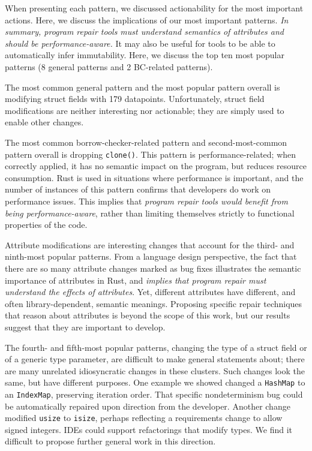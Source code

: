 When presenting each pattern, we discussed actionability for the most important actions. Here, we discuss the implications of our most important patterns. \emph{In summary, program repair tools must understand semantics of attributes and should be performance-aware.} It may also be useful for tools to be able to automatically infer immutability. Here, we discuss the top ten most popular patterns (8 general patterns and 2 BC-related patterns).

The most common general pattern and the most popular pattern overall is modifying struct fields with 179 datapoints. Unfortunately, struct field modifications are neither interesting nor actionable; they are simply used to enable other changes. 

The most common borrow-checker-related pattern and second-most-common pattern overall is dropping \texttt{clone()}. This pattern is performance-related; when correctly applied, it has no semantic impact on the program, but reduces resource consumption. Rust is used in situations where performance is important, and the number of instances of this pattern confirms that developers do work on performance issues. This implies that \emph{program repair tools would benefit from being performance-aware}, rather than limiting themselves strictly to functional properties of the code.

Attribute modifications are interesting changes that account for the third- and ninth-most popular patterns. From a language design perspective, the fact that there are so many attribute changes marked as bug fixes illustrates the semantic importance of attributes in Rust, and \emph{implies that program repair must understand the effects of attributes}. Yet, different attributes have different, and often library-dependent, semantic meanings. Proposing specific repair techniques that reason about attributes is beyond the scope of this work, but our results suggest that they are important to develop.

The fourth- and fifth-most popular patterns, changing the type of a struct field or of a generic type parameter, are difficult to make general statements about; there are many unrelated idiosyncratic changes in these clusters. Such changes look the same, but have different purposes. One example we showed changed a \texttt{HashMap} to an \texttt{IndexMap}, preserving iteration order. That specific nondeterminism bug could be automatically repaired upon direction from the developer. Another change modified \texttt{usize} to \texttt{isize}, perhaps reflecting a requirements change to allow signed integers. IDEs could support refactorings that modify types. We find it difficult to propose further general work in this direction.

